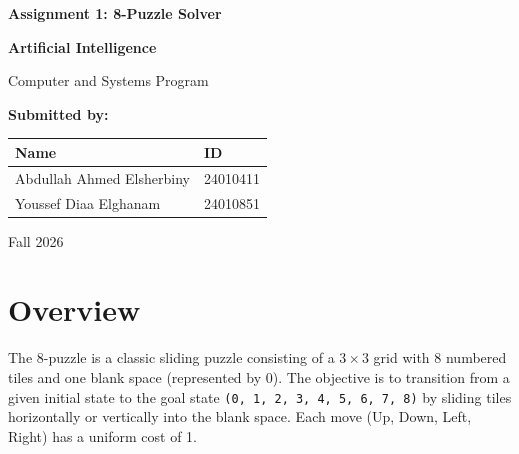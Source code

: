 \documentclass[11pt, a4paper]{article}
\begin{document}
\begin{titlepage}
    \thispagestyle{fancy}
    \centering
    \vspace*{4cm}
    {\Huge\color{primary}\textbf{Assignment 1: 8-Puzzle Solver}\par}
    \vspace{1.5cm}
    {\Large\textbf{Artificial Intelligence}\par}
    \vspace{0.5cm}
    {\large Computer and Systems Program\par}
    \vspace{3cm}
    \textbf{Submitted by:}\par
    \vspace{0.8cm}
    {\Large
    \begin{tabular}{ll}
        \textbf{Name} & \textbf{ID} \\
        \midrule
        Abdullah Ahmed Elsherbiny & 24010411 \\
        \addlinespace
        Youssef Diaa Elghanam & 24010851 \\
    \end{tabular}
    }\par
    \vfill
    {\large Fall 2026\par}
\end{titlepage}

\section{Overview}
The 8-puzzle is a classic sliding puzzle consisting of a $3 \times 3$ grid with 8 numbered tiles and one blank space (represented by 0). The objective is to transition from a given initial state to the goal state \texttt{(0, 1, 2, 3, 4, 5, 6, 7, 8)} by sliding tiles horizontally or vertically into the blank space. Each move (Up, Down, Left, Right) has a uniform cost of 1.
\end{document}
